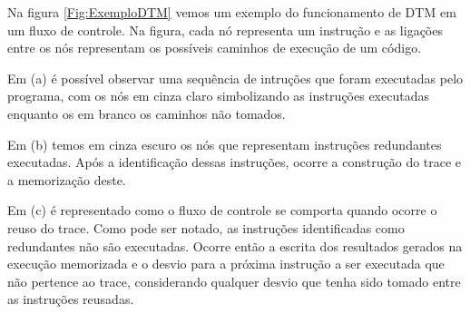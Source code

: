 
Na figura \ref{Fig:ExemploDTM} vemos um exemplo do funcionamento de DTM em um fluxo de controle. Na figura, cada nó representa um instrução e as ligações entre os nós representam os possíveis caminhos de execução de um código. 

Em (a) é possível observar uma sequência de intruções que foram executadas pelo programa, com os nós em cinza claro simbolizando as instruções executadas enquanto os em branco os caminhos não tomados.

Em (b) temos em cinza escuro os nós que representam instruções redundantes executadas. Após a identificação dessas instruções, ocorre a construção do trace e a memorização deste.

Em (c) é representado como o fluxo de controle se comporta quando ocorre o reuso do trace. Como pode ser notado, as instruções identificadas como redundantes não são executadas. Ocorre então a escrita dos resultados gerados na execução memorizada e o desvio para a próxima instrução a ser executada que não pertence ao trace, considerando qualquer desvio que tenha sido tomado entre as instruções reusadas.

